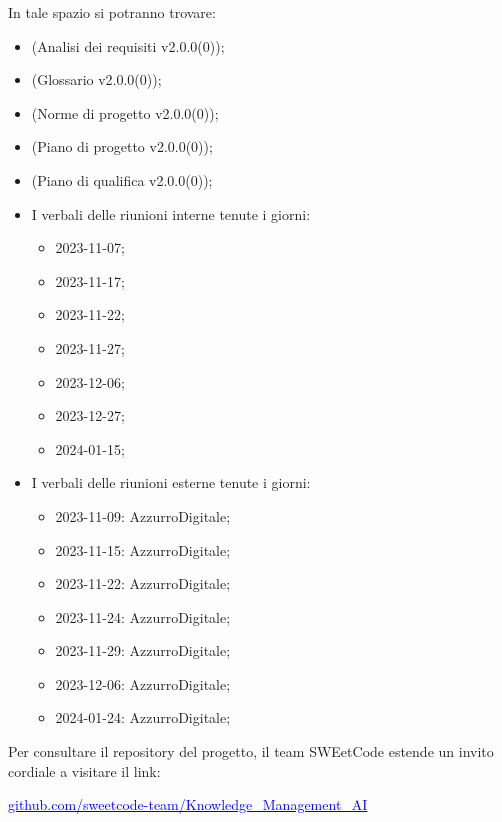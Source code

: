 \documentclass[10pt, a4paper]{article}
\begin{document}
\vspace{1em}
In tale spazio si potranno trovare:
\begin{itemize}
    \item (Analisi dei requisiti v2.0.0(0));
    \item (Glossario v2.0.0(0));
    \item (Norme di progetto v2.0.0(0));
    \item (Piano di progetto v2.0.0(0));
    \item (Piano di qualifica v2.0.0(0));
    \item I verbali delle riunioni interne tenute i giorni:
        \begin{itemize}
            \item 2023-11-07;
            \item 2023-11-17;
            \item 2023-11-22;
            \item 2023-11-27;
            \item 2023-12-06;
            \item 2023-12-27;
            \item 2024-01-15;
        \end{itemize}
   \item I verbali delle riunioni esterne tenute i giorni:
        \begin{itemize}
            \item 2023-11-09: AzzurroDigitale;
            \item 2023-11-15: AzzurroDigitale;
            \item 2023-11-22: AzzurroDigitale;
            \item 2023-11-24: AzzurroDigitale;
            \item 2023-11-29: AzzurroDigitale;
            \item 2023-12-06: AzzurroDigitale;
            \item 2024-01-24: AzzurroDigitale;
        \end{itemize}    
\end{itemize}

Per consultare il repository del progetto, il team SWEetCode estende un invito cordiale a visitare il link:\\
\begin{center}
\href{https://github.com/sweetcode-team/Knowledge_Management_AI}{\textcolor{blue}{github.com/sweetcode-team/Knowledge\_Management\_AI}}
\end{center}
\end{document}
